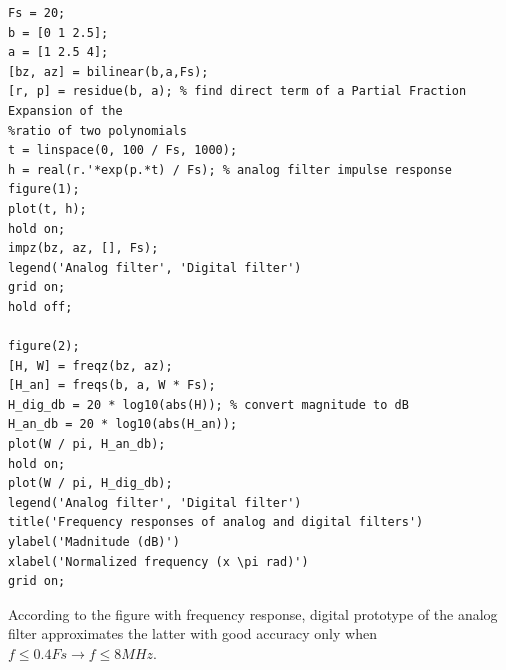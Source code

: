 \documentclass[16pt]{report}
\begin{document}
\begin{lstlisting}
Fs = 20;
b = [0 1 2.5];
a = [1 2.5 4];
[bz, az] = bilinear(b,a,Fs);
[r, p] = residue(b, a); % find direct term of a Partial Fraction Expansion of the 
%ratio of two polynomials
t = linspace(0, 100 / Fs, 1000);
h = real(r.'*exp(p.*t) / Fs); % analog filter impulse response
figure(1);
plot(t, h);
hold on;
impz(bz, az, [], Fs);
legend('Analog filter', 'Digital filter')
grid on;
hold off;

figure(2);
[H, W] = freqz(bz, az);
[H_an] = freqs(b, a, W * Fs);
H_dig_db = 20 * log10(abs(H)); % convert magnitude to dB
H_an_db = 20 * log10(abs(H_an));
plot(W / pi, H_an_db);
hold on;
plot(W / pi, H_dig_db);
legend('Analog filter', 'Digital filter')
title('Frequency responses of analog and digital filters')
ylabel('Madnitude (dB)')
xlabel('Normalized frequency (x \pi rad)')
grid on;
\end{lstlisting}
According to the figure with frequency response, digital prototype of the analog filter approximates the latter with good accuracy only when $f \leq 0.4Fs \rightarrow f \leq 8 MHz$.
\end{document}
